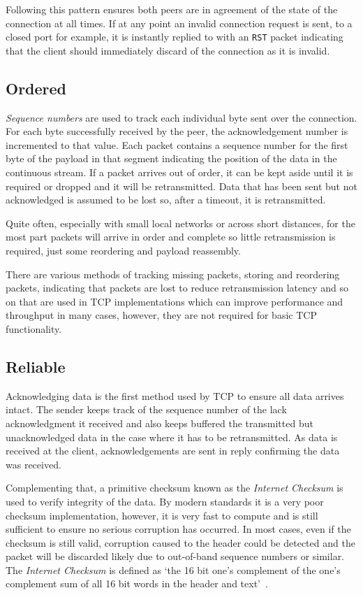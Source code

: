 \documentclass[11pt,a4paper,british]{bhamarticle}
\begin{document}
\begin{multicols}{2}
Following this pattern ensures both peers are in agreement of the state of the connection at all times. If at any point an invalid connection request is sent, to a closed port for example, it is instantly replied to with an \texttt{RST} packet indicating that the client should immediately discard of the connection as it is invalid.
\subsection{Ordered}
\textit{Sequence numbers} are used to track each individual byte sent over the connection. For each byte successfully received by the peer, the acknowledgement number is incremented to that value. Each packet contains a sequence number for the first byte of the payload in that segment indicating the position of the data in the continuous stream. If a packet arrives out of order, it can be kept aside until it is required or dropped and it will be retransmitted. Data that has been sent but not acknowledged is assumed to be lost so, after a timeout, it is retransmitted.

Quite often, especially with small local networks or across short distances, for the most part packets will arrive in order and complete so little retransmission is required, just some reordering and payload reassembly.

There are various methods of tracking missing packets, storing and reordering packets, indicating that packets are lost to reduce retransmission latency and so on that are used in TCP implementations which can improve performance and throughput in many cases, however, they are not required for basic TCP functionality.

\subsection{Reliable}\label{sec:reliable}
Acknowledging data is the first method used by TCP to ensure all data arrives intact. The sender keeps track of the sequence number of the lack acknowledgment it received and also keeps buffered the transmitted but unacknowledged data in the case where it has to be retransmitted. As data is received at the client, acknowledgements are sent in reply confirming the data was received.

Complementing that, a primitive checksum known as the \textit{Internet Checksum} is used to verify integrity of the data. By modern standards it is a very poor checksum implementation, however, it is very fast to compute and is still sufficient to ensure no serious corruption has occurred. In most cases, even if the checksum is still valid, corruption caused to the header could be detected and the packet will be discarded likely due to out-of-band sequence numbers or similar. The \textit{Internet Checksum} is defined as `the 16 bit one's complement of the one's complement sum of all 16 bit words in the header and text'~\cite[3.1]{rfc793}.


\end{multicols}
\end{document}

